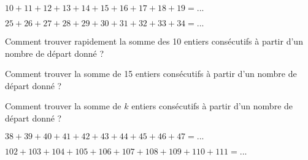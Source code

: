 \documentclass{beamer}
\begin{document}
\begin{frame}
	$10 + 11 + 12 + 13 + 14 + 15 + 16 + 17 + 18 + 19 = ...$

	\pause\vspace{3em}
	
	$25 + 26 + 27 + 28 + 29 + 30 + 31 + 32 + 33 + 34 = ...$
\end{frame}

\begin{frame}
	Comment trouver rapidement la somme des 10 entiers consécutifs à partir d'un nombre de départ donné ?

	\pause

	\vspace{1em}
	Comment trouver la somme de 15 entiers consécutifs à partir d'un nombre de départ donné ?

	\pause

	\vspace{1em}
	Comment trouver la somme de $k$ entiers consécutifs à partir d'un nombre de départ donné ?
\end{frame}

\begin{frame}
	$38 + 39 + 40 + 41 + 42 + 43 + 44 + 45 + 46 + 47 = ...$

	\pause\vspace{3em}

	$102 + 103 + 104 + 105 + 106 + 107 + 108 + 109 + 110 + 111 = ...$
\end{frame}
\end{document}
